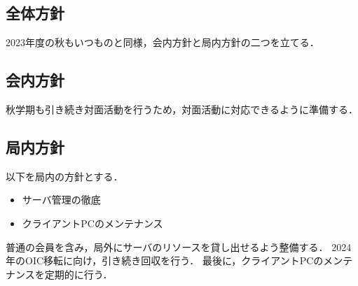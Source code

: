 \subsection*{全体方針}


2023年度の秋もいつものと同様，会内方針と局内方針の二つを立てる．

\subsection*{会内方針}
秋学期も引き続き対面活動を行うため，対面活動に対応できるように準備する．

\subsection*{局内方針}
以下を局内の方針とする．
\begin{itemize}
    \item サーバ管理の徹底
    \item クライアントPCのメンテナンス
\end{itemize}
普通の会員を含み，局外にサーバのリソースを貸し出せるよう整備する．
2024年のOIC移転に向け，引き続き回収を行う．
最後に，クライアントPCのメンテナンスを定期的に行う．